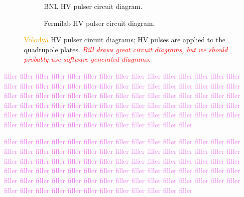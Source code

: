 \begin{figure}[]
	\centering
	\begin{subfigure}{\columnwidth}
		\caption{BNL HV pulser circuit diagram.}\label{fig:bnl_hv_pulse_cirdia}
	\end{subfigure}
	\begin{subfigure}{\columnwidth}
		\caption{Fermilab HV pulser circuit diagram.}\label{fig:fnal_hv_pulse_cirdia}
	\end{subfigure}
	\caption{\textcolor{orange}{Volodya} HV pulser circuit diagrams; HV pulses are applied to the quadrupole plates. \textcolor{red}{\textit{Bill draws great circuit diagrams, but we should probably use software generated diagrams.}}}\label{fig:hv_pulse_cirdia}
\end{figure}

\textcolor{violet}{filler filler filler filler filler filler filler filler filler filler filler filler filler filler filler filler filler filler filler filler filler filler filler filler filler filler filler filler filler filler filler filler filler filler filler filler filler filler filler filler filler filler filler filler filler filler filler filler filler filler filler filler filler filler filler filler filler filler filler filler filler filler filler filler filler filler filler filler filler filler filler filler filler filler filler filler filler filler filler filler filler filler filler filler filler filler filler}

\textcolor{violet}{filler filler filler filler filler filler filler filler filler filler filler filler filler filler filler filler filler filler filler filler filler filler filler filler filler filler filler filler filler filler filler filler filler filler filler filler filler filler filler filler filler filler filler filler filler filler filler filler filler filler filler filler filler filler filler filler filler filler filler filler filler filler filler filler filler filler filler filler filler filler filler filler filler filler filler filler filler filler filler filler filler filler filler filler filler filler filler}

